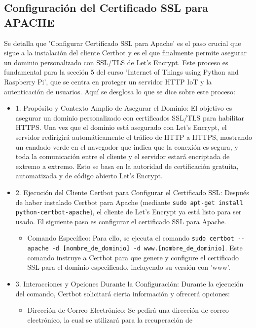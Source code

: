 \documentclass{report}
\begin{document}
\subsection{Configuración del Certificado SSL para APACHE}
Se detalla que 'Configurar Certificado SSL para Apache' es el paso crucial que sigue a la instalación del cliente Certbot 
y es el que finalmente permite asegurar un dominio personalizado con SSL/TLS de Let's Encrypt. Este proceso es fundamental para la 
sección 5 del curso 'Internet of Things using Python and Raspberry Pi', que se centra en proteger un servidor HTTP IoT y la 
autenticación de usuarios.
Aquí se desglosa lo que se  dice sobre este proceso:
\begin{itemize}
    \item 1. Propósito y Contexto Amplio de Asegurar el Dominio: El objetivo es asegurar un dominio personalizado con certificados 
    SSL/TLS para habilitar HTTPS. Una vez que el dominio está asegurado con Let's Encrypt, el servidor redirigirá automáticamente el 
    tráfico de HTTP a HTTPS, mostrando un candado verde en el navegador que indica que la conexión es segura, y toda la comunicación entre 
    el cliente y el servidor estará encriptada de extremo a extremo. Esto se basa en la autoridad de certificación gratuita, automatizada y 
    de código abierto Let's Encrypt.
    \item 2. Ejecución del Cliente Certbot para Configurar el Certificado SSL: Después de haber instalado Certbot para Apache 
    (mediante \verb|sudo apt-get install python-certbot-apache|), el cliente de Let's Encrypt ya está listo para ser usado. El siguiente 
    paso es configurar el certificado SSL para Apache.
        \begin{itemize}
            \item Comando Específico: Para ello, se ejecuta el comando \verb|sudo certbot --apache -d [nombre_de_dominio] -d www.[nombre_de_dominio]|. 
            Este comando instruye a Certbot para que genere y configure el certificado SSL para el dominio especificado, incluyendo su 
            versión con 'www'.        
        \end{itemize}
    \item 3. Interacciones y Opciones Durante la Configuración: Durante la ejecución del comando, Certbot solicitará cierta información y 
    ofrecerá opciones:
        \begin{itemize}
            \item Dirección de Correo Electrónico: Se pedirá una dirección de correo electrónico, la cual se utilizará para la recuperación de 

\end{itemize}
\end{itemize}
\end{document}
